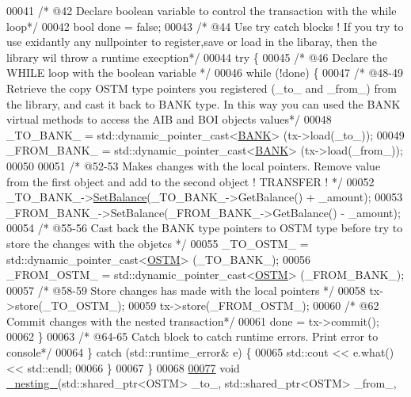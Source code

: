 \begin{DoxyCode}
00041     \textcolor{comment}{/* @42 Declare boolean variable to control the transaction with the while loop*/}
00042     \textcolor{keywordtype}{bool} done = \textcolor{keyword}{false};
00043     \textcolor{comment}{/* @44 Use try catch blocks ! If you try to use exidantly any nullpointer to register,save or load in
       the libaray, then the library wil throw a runtime execption*/}
00044     \textcolor{keywordflow}{try} \{
00045         \textcolor{comment}{/* @46 Declare the WHILE loop with the boolean variable */}
00046         \textcolor{keywordflow}{while} (!done) \{
00047             \textcolor{comment}{/* @48-49 Retrieve the copy OSTM type pointers you registered (\_to\_ and \_from\_) from the
       library, and cast it back to BANK type. In this way you can used the BANK virtual methods to access the AIB and
       BOI objects values*/}
00048             \_TO\_BANK\_ = std::dynamic\_pointer\_cast<\hyperlink{class_b_a_n_k}{BANK}> (tx->load(\_to\_));
00049             \_FROM\_BANK\_ = std::dynamic\_pointer\_cast<\hyperlink{class_b_a_n_k}{BANK}> (tx->load(\_from\_));
00050           
00051             \textcolor{comment}{/* @52-53 Makes changes with the local pointers. Remove value from the first object and add to
       the second object ! TRANSFER ! */}
00052             \_TO\_BANK\_->\hyperlink{class_b_a_n_k_ae3e45b407bf8ec7175662442ea24b7c0_ae3e45b407bf8ec7175662442ea24b7c0}{SetBalance}(\_TO\_BANK\_->GetBalance() + \_amount);
00053             \_FROM\_BANK\_->SetBalance(\_FROM\_BANK\_->GetBalance() - \_amount);
00054             \textcolor{comment}{/* @55-56 Cast back the BANK type pointers to OSTM type before try to store the changes with
       the objetcs */}
00055             \_TO\_OSTM\_ = std::dynamic\_pointer\_cast<\hyperlink{class_o_s_t_m}{OSTM}> (\_TO\_BANK\_);
00056             \_FROM\_OSTM\_ = std::dynamic\_pointer\_cast<\hyperlink{class_o_s_t_m}{OSTM}> (\_FROM\_BANK\_);
00057             \textcolor{comment}{/* @58-59 Store changes has made with the local pointers */}
00058             tx->store(\_TO\_OSTM\_);
00059             tx->store(\_FROM\_OSTM\_);
00060             \textcolor{comment}{/* @62 Commit changes with the nested transaction*/}
00061             done = tx->commit();
00062         \}
00063     \textcolor{comment}{/* @64-65 Catch block to catch runtime errors. Print error to console*/}
00064     \} \textcolor{keywordflow}{catch} (std::runtime\_error& e) \{
00065         std::cout << e.what() << std::endl;
00066     \}
00067 \}
00068 
\hypertarget{main_8cpp_source.tex_l00077}{}\hyperlink{main_8cpp_a5675cb594d74aa1bf5e80233370ffd81_a5675cb594d74aa1bf5e80233370ffd81}{00077} \textcolor{keywordtype}{void} \hyperlink{main_8cpp_a5675cb594d74aa1bf5e80233370ffd81_a5675cb594d74aa1bf5e80233370ffd81}{\_nesting\_}(std::shared\_ptr<OSTM> \_to\_, std::shared\_ptr<OSTM> \_from\_, 

\end{DoxyCode}
